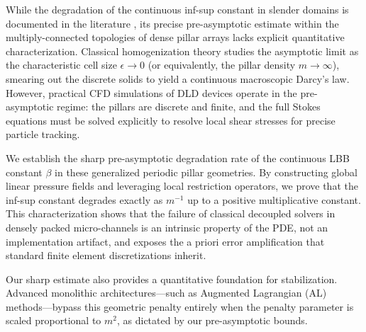 \documentclass{elsarticle}
\begin{document}
While the degradation of the continuous inf-sup constant in slender domains is documented in the literature \cite{Chizhonkov2000,Dobrowolski2003, sande2025robust}, its precise pre-asymptotic estimate within the multiply-connected topologies of dense pillar arrays lacks explicit quantitative characterization. Classical homogenization theory \cite{Allaire1991,Lu2020} studies the asymptotic limit as the characteristic cell size $\epsilon \to 0$ (or equivalently, the pillar density $m \to \infty$), smearing out the discrete solids to yield a continuous macroscopic Darcy's law. However, practical CFD simulations of DLD devices operate in the pre-asymptotic regime: the pillars are discrete and finite, and the full Stokes equations must be solved explicitly to resolve local shear stresses for precise particle tracking.

We establish the sharp pre-asymptotic degradation rate of the continuous LBB constant $\beta$ in these generalized periodic pillar geometries. By constructing global linear pressure fields and leveraging local restriction operators, we prove that the inf-sup constant degrades exactly as $m^{-1}$ up to a positive multiplicative constant. This characterization shows that the failure of classical decoupled solvers in densely packed micro-channels is an intrinsic property of the PDE, not an implementation artifact, and exposes the a priori error amplification that standard finite element discretizations inherit.

Our sharp estimate also provides a quantitative foundation for stabilization. Advanced monolithic architectures—such as Augmented Lagrangian (AL) methods—bypass this geometric penalty entirely \cite{Benzi2006, Farrell2019, Fortin1983, Glowinski1989} when the penalty parameter is scaled proportional to $m^2$, as dictated by our pre-asymptotic bounds.
\end{document}

